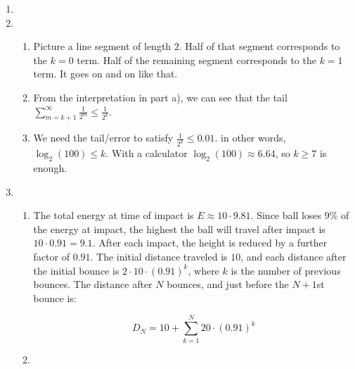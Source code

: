 \begin{enumerate}
    \item
    
    \item \begin{enumerate}
        \item 
    Picture a line segment of length $2$. Half of that segment corresponds to the $k=0$ term. Half of the remaining segment corresponds to the $k=1$ term. It goes on and on like that. 

    \item From the interpretation in part a), we can see that the tail $\sum_{m=k+1}^\infty \frac{1}{2^m} \leq \frac{1}{2^k}$. 

    \item We need the tail/error to satisfy $\frac{1}{2^k}\leq 0.01$. in other words, $\log_2(100)\leq k$. With a calculator $\log_2(100) \approx 6.64$, so $k\geq 7$ is enough. 
   
    \end{enumerate}
    \item
    \begin{enumerate}
        \item The total energy at time of impact is $E \approx 10\cdot 9.81$. Since ball loses $9$\% of the energy at impact, the highest the ball will travel after impact is $10\cdot 0.91 = 9.1$. After each impact, the height is reduced by a further factor of $0.91$. The initial distance traveled is $10$, and each distance after the initial bounce is $2\cdot10\cdot(0.91)^k$, where $k$ is the number of previous bounces. The distance after $N$ bounces, and just before the $N+1$st bounce is:
        
        \[D_N = 10+\sum_{k=1}^N 20 \cdot(0.91)^k\]

        \item 
    \end{enumerate}
    
    
        
\end{enumerate}